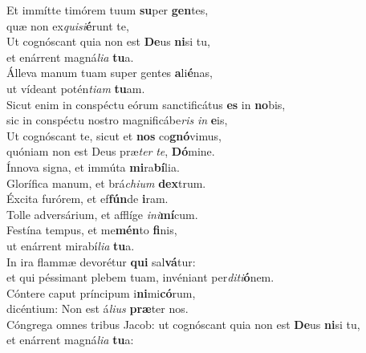 \evenverse Et immítte timórem tuum \textbf{su}per \textbf{gen}tes,~\*\\
\evenverse quæ non ex\textit{qui}\textit{si}\textbf{é}runt te,\\
\oddverse Ut cognóscant quia non est \textbf{De}us \textbf{ni}si tu,~\*\\
\oddverse et enárrent magná\textit{li}\textit{a} \textbf{tu}a.\\
\evenverse Álleva manum tuam super gentes \textbf{a}li\textbf{é}nas,~\*\\
\evenverse ut vídeant potén\textit{ti}\textit{am} \textbf{tu}am.\\
\oddverse Sicut enim in conspéctu eórum sanctificátus \textbf{es} in \textbf{no}bis,~\*\\
\oddverse sic in conspéctu nostro magnificábe\textit{ris} \textit{in} \textbf{e}is,\\
\evenverse Ut cognóscant te, sicut et \textbf{nos} co\textbf{gnó}vimus,~\*\\
\evenverse quóniam non est Deus præ\textit{ter} \textit{te}, \textbf{Dó}mine.\\
\oddverse Ínnova signa, et immúta \textbf{mi}ra\textbf{bí}lia.~\*\\
\oddverse Glorífica manum, et brá\textit{chi}\textit{um} \textbf{dex}trum.\\
\evenverse Éxcita furórem, et ef\textbf{fún}de \textbf{i}ram.~\*\\
\evenverse Tolle adversárium, et afflíge \textit{i}\textit{ni}\textbf{mí}cum.\\
\oddverse Festína tempus, et me\textbf{mén}to \textbf{fi}nis,~\*\\
\oddverse ut enárrent mirabí\textit{li}\textit{a} \textbf{tu}a.\\
\evenverse In ira flammæ devorétur \textbf{qui} sal\textbf{vá}tur:~\*\\
\evenverse et qui péssimant plebem tuam, invéniant per\textit{di}\textit{ti}\textbf{ó}nem.\\
\oddverse Cóntere caput príncipum i\textbf{ni}mi\textbf{có}rum,~\*\\
\oddverse dicéntium: Non est á\textit{li}\textit{us} \textbf{præ}ter nos.\\
\evenverse Cóngrega omnes tribus Jacob: ut cognóscant quia non est \textbf{De}us \textbf{ni}si tu,~\*\\
\evenverse et enárrent magná\textit{li}\textit{a} \textbf{tu}a:\\

